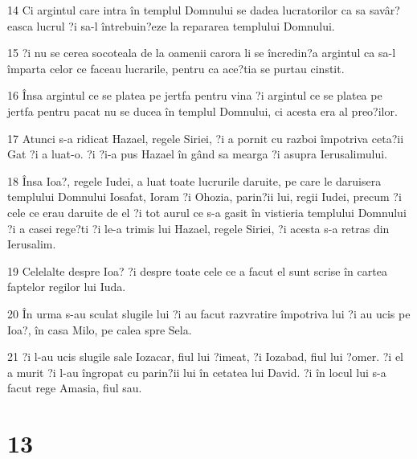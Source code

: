 \par 14 Ci argintul care intra în templul Domnului se dadea lucratorilor ca sa savâr?easca lucrul ?i sa-l întrebuin?eze la repararea templului Domnului.
\par 15 ?i nu se cerea socoteala de la oamenii carora li se încredin?a argintul ca sa-l împarta celor ce faceau lucrarile, pentru ca ace?tia se purtau cinstit.
\par 16 Însa argintul ce se platea pe jertfa pentru vina ?i argintul ce se platea pe jertfa pentru pacat nu se ducea în templul Domnului, ci acesta era al preo?ilor.
\par 17 Atunci s-a ridicat Hazael, regele Siriei, ?i a pornit cu razboi împotriva ceta?ii Gat ?i a luat-o. ?i ?i-a pus Hazael în gând sa mearga ?i asupra Ierusalimului.
\par 18 Însa Ioa?, regele Iudei, a luat toate lucrurile daruite, pe care le daruisera templului Domnului Iosafat, Ioram ?i Ohozia, parin?ii lui, regii Iudei, precum ?i cele ce erau daruite de el ?i tot aurul ce s-a gasit în vistieria templului Domnului ?i a casei rege?ti ?i le-a trimis lui Hazael, regele Siriei, ?i acesta s-a retras din Ierusalim.
\par 19 Celelalte despre Ioa? ?i despre toate cele ce a facut el sunt scrise în cartea faptelor regilor lui Iuda.
\par 20 În urma s-au sculat slugile lui ?i au facut razvratire împotriva lui ?i au ucis pe Ioa?, în casa Milo, pe calea spre Sela.
\par 21 ?i l-au ucis slugile sale Iozacar, fiul lui ?imeat, ?i Iozabad, fiul lui ?omer. ?i el a murit ?i l-au îngropat cu parin?ii lui în cetatea lui David. ?i în locul lui s-a facut rege Amasia, fiul sau.

\chapter{13}

